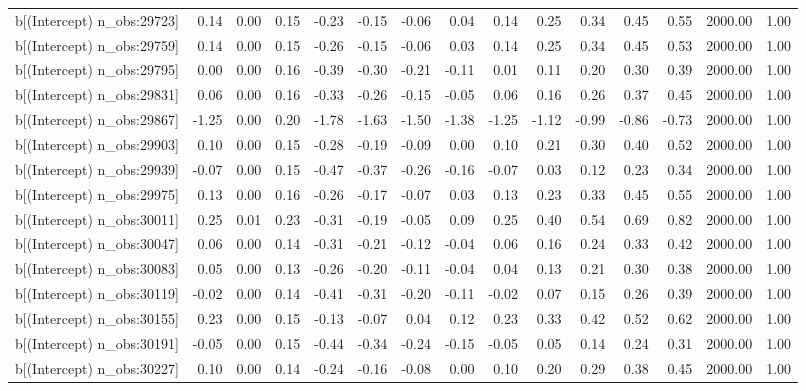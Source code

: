 \begin{table}[ht]
\begin{tabular}{rrrrrrrrrrrrrrr}
  b[(Intercept) n\_obs:29723] & 0.14 & 0.00 & 0.15 & -0.23 & -0.15 & -0.06 & 0.04 & 0.14 & 0.25 & 0.34 & 0.45 & 0.55 & 2000.00 & 1.00 \\ 
  b[(Intercept) n\_obs:29759] & 0.14 & 0.00 & 0.15 & -0.26 & -0.15 & -0.06 & 0.03 & 0.14 & 0.25 & 0.34 & 0.45 & 0.53 & 2000.00 & 1.00 \\ 
  b[(Intercept) n\_obs:29795] & 0.00 & 0.00 & 0.16 & -0.39 & -0.30 & -0.21 & -0.11 & 0.01 & 0.11 & 0.20 & 0.30 & 0.39 & 2000.00 & 1.00 \\ 
  b[(Intercept) n\_obs:29831] & 0.06 & 0.00 & 0.16 & -0.33 & -0.26 & -0.15 & -0.05 & 0.06 & 0.16 & 0.26 & 0.37 & 0.45 & 2000.00 & 1.00 \\ 
  b[(Intercept) n\_obs:29867] & -1.25 & 0.00 & 0.20 & -1.78 & -1.63 & -1.50 & -1.38 & -1.25 & -1.12 & -0.99 & -0.86 & -0.73 & 2000.00 & 1.00 \\ 
  b[(Intercept) n\_obs:29903] & 0.10 & 0.00 & 0.15 & -0.28 & -0.19 & -0.09 & 0.00 & 0.10 & 0.21 & 0.30 & 0.40 & 0.52 & 2000.00 & 1.00 \\ 
  b[(Intercept) n\_obs:29939] & -0.07 & 0.00 & 0.15 & -0.47 & -0.37 & -0.26 & -0.16 & -0.07 & 0.03 & 0.12 & 0.23 & 0.34 & 2000.00 & 1.00 \\ 
  b[(Intercept) n\_obs:29975] & 0.13 & 0.00 & 0.16 & -0.26 & -0.17 & -0.07 & 0.03 & 0.13 & 0.23 & 0.33 & 0.45 & 0.55 & 2000.00 & 1.00 \\ 
  b[(Intercept) n\_obs:30011] & 0.25 & 0.01 & 0.23 & -0.31 & -0.19 & -0.05 & 0.09 & 0.25 & 0.40 & 0.54 & 0.69 & 0.82 & 2000.00 & 1.00 \\ 
  b[(Intercept) n\_obs:30047] & 0.06 & 0.00 & 0.14 & -0.31 & -0.21 & -0.12 & -0.04 & 0.06 & 0.16 & 0.24 & 0.33 & 0.42 & 2000.00 & 1.00 \\ 
  b[(Intercept) n\_obs:30083] & 0.05 & 0.00 & 0.13 & -0.26 & -0.20 & -0.11 & -0.04 & 0.04 & 0.13 & 0.21 & 0.30 & 0.38 & 2000.00 & 1.00 \\ 
  b[(Intercept) n\_obs:30119] & -0.02 & 0.00 & 0.14 & -0.41 & -0.31 & -0.20 & -0.11 & -0.02 & 0.07 & 0.15 & 0.26 & 0.39 & 2000.00 & 1.00 \\ 
  b[(Intercept) n\_obs:30155] & 0.23 & 0.00 & 0.15 & -0.13 & -0.07 & 0.04 & 0.12 & 0.23 & 0.33 & 0.42 & 0.52 & 0.62 & 2000.00 & 1.00 \\ 
  b[(Intercept) n\_obs:30191] & -0.05 & 0.00 & 0.15 & -0.44 & -0.34 & -0.24 & -0.15 & -0.05 & 0.05 & 0.14 & 0.24 & 0.31 & 2000.00 & 1.00 \\ 
  b[(Intercept) n\_obs:30227] & 0.10 & 0.00 & 0.14 & -0.24 & -0.16 & -0.08 & 0.00 & 0.10 & 0.20 & 0.29 & 0.38 & 0.45 & 2000.00 & 1.00 \\ 

\end{tabular}
\end{table}
